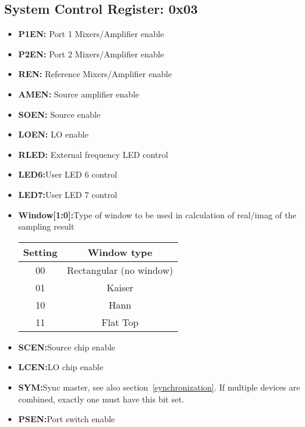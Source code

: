 \documentclass{article}
\newcommand{\bitrect}[2]{
  \begin{pgfonlayer}{foreground}
    \draw [thick] (0,0) rectangle (#1,1);
    \pgfmathsetmacro\result{#1-1}
    \foreach \x in {1,...,\result}
      \draw [thick] (\x,1) -- (\x, 0.8);
  \end{pgfonlayer}
  \bitlabels{#1}{#2}
}
\newcommand{\rwbits}[3]{
  \draw [thick] (#1,0) rectangle ++(#2,1) node[pos=0.5]{#3};
  \pgfmathsetmacro\start{#1+0.5}
  \pgfmathsetmacro\finish{#1+#2-0.5}
}
\newcommand{\robits}[3]{
  \begin{pgfonlayer}{background}
    \draw [thick, fill=lightgray] (#1,0) rectangle ++(#2,1) node[pos=0.5]{#3};
  \end{pgfonlayer}
  \pgfmathsetmacro\start{#1+0.5}
  \pgfmathsetmacro\finish{#1+#2-0.5}
}
\newcommand{\bitlabels}[2]{
  \foreach \bit in {1,...,#1}{
     \pgfmathsetmacro\result{#2}
     \node [above] at (\bit-0.5, 1) {\pgfmathprintnumber{\result}};
   }
}
\begin{document}
\subsection{System Control Register: 0x03}
\begin{center}
\end{center}
\begin{itemize}
\item \textbf{P1EN:} Port 1 Mixers/Amplifier enable
\item \textbf{P2EN:} Port 2 Mixers/Amplifier enable
\item \textbf{REN:} Reference Mixers/Amplifier enable
\item \textbf{AMEN:} Source amplifier enable
\item \textbf{SOEN:} Source enable
\item \textbf{LOEN:} LO enable
\item \textbf{RLED:} External frequency LED control
\item \textbf{LED6:}{User LED 6 control}
\item \textbf{LED7:}{User LED 7 control}
\item \textbf{Window[1:0]:}{Type of window to be used in calculation of real/imag of the sampling result}
\begin{center}
\begin{tabular}{ c|c }
Setting & Window type\\
 \hline
00 & Rectangular (no window)\\
01 & Kaiser\\
10 & Hann\\
11 & Flat Top\\
\end{tabular}
\end{center}
\item \textbf{SCEN:}{Source chip enable}
\item \textbf{LCEN:}{LO chip enable}
\item \textbf{SYM:}{Sync master, see also section~\ref{synchronization}. If multiple devices are combined, exactly one must have this bit set.}
\item \textbf{PSEN:}{Port switch enable}
\end{itemize}
\end{document}
